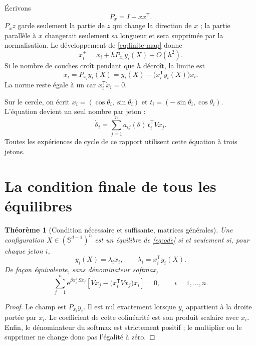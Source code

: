 \documentclass[11pt,a4paper]{article}
\newtheorem{theorem}{Théorème}[section]
\theoremstyle{definition}
\newcommand{\sphere}{\mathbb S}
\newcommand{\e}{\mathrm e}
\newcommand{\T}{\mathsf T}
\begin{document}
Écrivons
\[
 P_x=I-xx^{\T}.
\]
$P_xz$ garde seulement la partie de $z$ qui change la direction de $x$ ; la partie
parallèle à $x$ changerait seulement sa longueur et sera supprimée par la normalisation.
Le développement de \eqref{eq:finite-map} donne
\[
 x_i^+=x_i+hP_{x_i}y_i(X)+O(h^2).
\]
Si le nombre de couches croît pendant que $h$ décroît, la limite est
\begin{equation}
 \boxed{\quad \dot x_i=P_{x_i}y_i(X)
 =y_i(X)-\bigl(x_i^{\T}y_i(X)\bigr)x_i.\quad}              \label{eq:ode}
\end{equation}
La norme reste égale à un car $x_i^{\T}\dot x_i=0$.

Sur le cercle, on écrit $x_i=(\cos\theta_i,\sin\theta_i)$ et
$t_i=(-\sin\theta_i,\cos\theta_i)$. L'équation devient un seul nombre par jeton :
\begin{equation}
 \dot\theta_i=\sum_{j=1}^n a_{ij}(\theta)\,t_i^{\T}Vx_j.  \label{eq:circle}
\end{equation}
Toutes les expériences de cycle de ce rapport utilisent cette équation à trois jetons.

\section{La condition finale de tous les équilibres}
\label{sec:equilibria}

\begin{theorem}[Condition nécessaire et suffisante, matrices générales]
\label{thm:general-equilibrium}
Une configuration $X\in(\sphere^{d-1})^n$ est un équilibre de
\eqref{eq:ode} si et seulement si, pour chaque jeton $i$,
\begin{equation}
 \boxed{\quad y_i(X)=\lambda_i x_i,
 \qquad \lambda_i=x_i^{\T}y_i(X).\quad}                   \label{eq:parallel-condition}
\end{equation}
De façon équivalente, sans dénominateur softmax,
\begin{equation}
 \boxed{\quad
 \sum_{j=1}^n \e^{\beta x_i^{\T}Sx_j}
 \left[Vx_j-\bigl(x_i^{\T}Vx_j\bigr)x_i\right]=0,
 \qquad i=1,\ldots,n.\quad}                               \label{eq:final-equilibrium}
\end{equation}
\end{theorem}

\begin{proof}
Le champ est $P_{x_i}y_i$. Il est nul exactement lorsque $y_i$ appartient à la droite
portée par $x_i$. Le coefficient de cette colinéarité est son produit scalaire avec
$x_i$. Enfin, le dénominateur du softmax est strictement positif ; le multiplier ou le
supprimer ne change donc pas l'égalité à zéro.
\end{proof}
\end{document}
